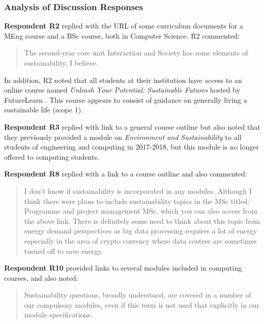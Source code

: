 \subsubsection*{Analysis of Discussion Responses}

\textbf{Respondent R2} replied with the URL of some curriculum documents for a MEng course and a BSc course, both in Computer Science. R2 commented:
\begin{quote}
    The second-year core unit Interaction and Society has some elements of sustainability, I believe.
\end{quote}
In addition, R2 noted that all students at their institution have access to an online course named \emph{Unleash Your Potential: Sustainable Futures} hosted by FutureLearn \citep{Preist2020}. This course appears to consist of guidance on generally living a sustainable life (scope 1).

\textbf{Respondent R3} replied with link to a general course outline but also noted that they previously provided a module on \emph{Environment and Sustainability} to all students of engineering and computing in 2017-2018, but this module is no longer offered to computing students.

\textbf{Respondent R8} replied with a link to a course outline and also commented:
\begin{quote}
    I don’t know if sustainability is incorporated in any modules. Although I think there were plans to include sustainability topics in the MSc titled: Programme and project management MSc, which you can also access from the above link. There is definitely some need to think about this topic from energy demand perspectives as big data processing requires a lot of energy especially in the area of crypto currency where data centres are sometimes turned off to save energy.
\end{quote}

\textbf{Respondent R10} provided links to several modules included in computing courses, and also noted:
\begin{quote}
    Sustainability questions, broadly understood, are covered in a number of our compulsory modules, even if this term is not used that explicitly in our module specifications.
\end{quote}

